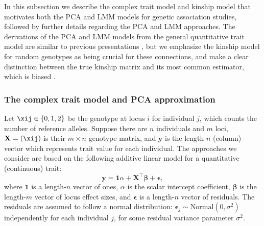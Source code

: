 \documentclass[11pt]{article}
\begin{document}
In this subsection we describe the complex trait model and kinship model that motivates both the PCA and LMM models for genetic association studies, followed by further details regarding the PCA and LMM approaches.
The derivations of the PCA and LMM models from the general quantitative trait model are similar to previous presentations \citep{astle_population_2009, janss_inferences_2012, hoffman_correcting_2013}, but we emphasize the kinship model for random genotypes as being crucial for these connections, and make a clear distinction between the true kinship matrix and its most common estimator, which is biased \citep{ochoa_fst2, ochoa_human}.

\subsubsection{The complex trait model and PCA approximation}

Let $\xij \in \{ 0, 1, 2 \}$ be the genotype at locus $i$ for individual $j$, which counts the number of reference alleles.
Suppose there are $n$ individuals and $m$ loci,
$\mathbf{X} = ( \xij )$ is their $m \times n$ genotype matrix, and
$\mathbf{y}$ is the length-$n$ (column) vector which represents trait value for each individual.
The approaches we consider are based on the following additive linear model for a quantitative (continuous) trait:
\begin{equation}
  \label{eq:trait}
  \mathbf{y}
  =
  \mathbf{1} \alpha + \mathbf{X}^\intercal \mathbf{\beta} + \mathbf{\epsilon}
  ,
\end{equation}
where
$\mathbf{1}$ is a length-$n$ vector of ones,
$\alpha$ is the scalar intercept coefficient,
$\mathbf{\beta}$ is the length-$m$ vector of locus effect sizes, and
$\mathbf{\epsilon}$ is a length-$n$ vector of residuals.
The residuals are assumed to follow a normal distribution: $\mathbf{\epsilon}_j \sim \text{Normal}(0, \sigma^2)$ independently for each individual $j$, for some residual variance parameter $\sigma^2$.
\end{document}
